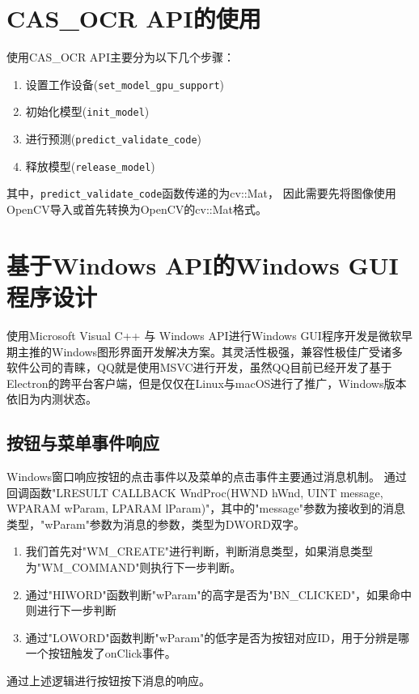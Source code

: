 \section{CAS\_OCR API的使用}

使用CAS\_OCR API主要分为以下几个步骤：
\begin{enumerate}
	\item 设置工作设备(\texttt{set\_model\_gpu\_support})
	\item 初始化模型(\texttt{init\_model})
	\item 进行预测(\texttt{predict\_validate\_code})
	\item 释放模型(\texttt{release\_model})
\end{enumerate}

其中，\texttt{predict\_validate\_code}函数传递的为cv::Mat，
因此需要先将图像使用OpenCV导入或首先转换为OpenCV的cv::Mat格式。

\section{基于Windows API的Windows GUI程序设计}

使用Microsoft Visual C++ 与 Windows API进行Windows GUI程序开发是微软早期主推的Windows图形界面开发解决方案。其灵活性极强，兼容性极佳广受诸多软件公司的青睐，QQ就是使用MSVC进行开发，虽然QQ目前已经开发了基于Electron的跨平台客户端，但是仅仅在Linux与macOS进行了推广，Windows版本依旧为内测状态。

\subsection{按钮与菜单事件响应}

Windows窗口响应按钮的点击事件以及菜单的点击事件主要通过消息机制。
通过回调函数"LRESULT CALLBACK WndProc(HWND hWnd, UINT message, WPARAM wParam, LPARAM lParam)"，其中的"message"参数为接收到的消息类型，"wParam"参数为消息的参数，类型为DWORD双字。

\begin{enumerate}
	\item 我们首先对"WM\_CREATE"进行判断，判断消息类型，如果消息类型为"WM\_COMMAND"则执行下一步判断。
	\item 通过"HIWORD"函数判断"wParam"的高字是否为"BN\_CLICKED"，如果命中则进行下一步判断
	\item 通过"LOWORD"函数判断"wParam"的低字是否为按钮对应ID，用于分辨是哪一个按钮触发了onClick事件。
\end{enumerate}

通过上述逻辑进行按钮按下消息的响应。

